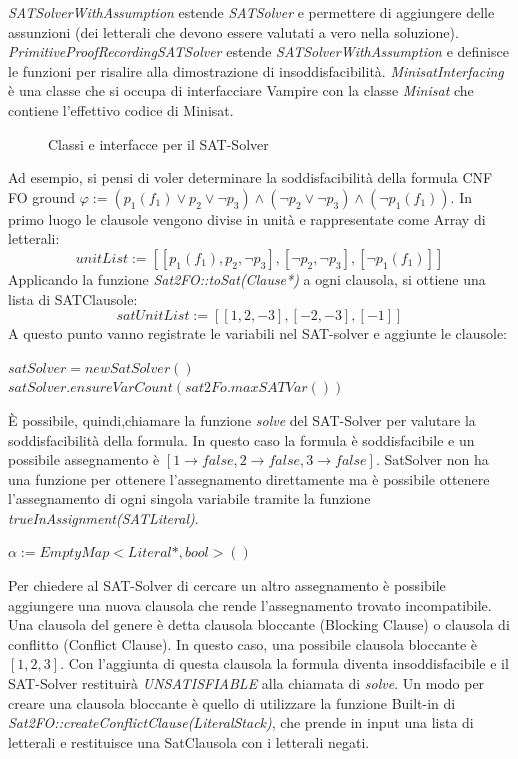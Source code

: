 \documentclass[./main.tex]{subfiles}
\begin{document}
\textit{SATSolverWithAssumption} estende \textit{SATSolver} e permettere di aggiungere delle assunzioni (dei letterali che devono essere valutati a vero nella soluzione).
\textit{PrimitiveProofRecordingSATSolver} estende \textit{SATSolverWithAssumption} e definisce le funzioni per risalire alla dimostrazione di insoddisfacibilità.
\textit{MinisatInterfacing} è una classe che si occupa di interfacciare Vampire con la classe \textit{Minisat} che contiene
l'effettivo codice di Minisat.

\begin{figure}[h]
    \centering
    \scalebox{0.5}{
        
    }
    \caption{Classi e interfacce per il SAT-Solver}
    \label{fig:vampire_sat_solver}
\end{figure}

Ad esempio, si pensi di voler determinare la soddisfacibilità della formula CNF FO ground 
$\varphi := (p_1(f_1) \lor p_2 \lor \lnot p_3) \land (\lnot p_2 \lor \lnot p_3) \land (\lnot p_1(f_1))$.
In primo luogo le clausole vengono divise in unità e rappresentate come Array di letterali:
$$unitList := [[p_1(f_1), p_2, \lnot p_3], [\lnot p_2, \lnot p_3], [\lnot p_1(f_1)]]$$
Applicando la funzione \textit{Sat2FO::toSat(Clause*)} a ogni clausola, si ottiene una lista di SATClausole:
$$satUnitList := [[1, 2, -3], [-2, -3], [-1]]$$
A questo punto vanno registrate le variabili nel SAT-solver e aggiunte le clausole:

$satSolver = new SatSolver()$ \\
$satSolver.ensureVarCount(sat2Fo.maxSATVar())$ \\

È possibile, quindi,chiamare la funzione \textit{solve} del SAT-Solver per valutare la soddisfacibilità della formula.
In questo caso la formula è soddisfacibile e un possibile assegnamento è $[1{\rightarrow}false, 2{\rightarrow}false, 3{\rightarrow}false]$.
SatSolver non ha una funzione per ottenere l'assegnamento direttamente ma è possibile ottenere l'assegnamento di ogni singola variabile
tramite la funzione \textit{trueInAssignment(SATLiteral)}.

$\alpha := EmptyMap<Literal*, bool>()$ \\


Per chiedere al SAT-Solver di cercare un altro assegnamento è possibile aggiungere una nuova clausola 
che rende l'assegnamento trovato incompatibile. Una clausola del genere è detta clausola bloccante (Blocking Clause) o clausola di conflitto (Conflict Clause).
In questo caso, una possibile clausola bloccante è $[1,2,3]$. 
Con l'aggiunta di questa clausola la formula diventa insoddisfacibile e il SAT-Solver restituirà \textit{UNSATISFIABLE} alla chiamata di \textit{solve}.
Un modo per creare una clausola bloccante è quello di utilizzare la funzione Built-in di \textit{Sat2FO::createConflictClause(LiteralStack)}, 
che prende in input una lista di letterali e restituisce una SatClausola con i letterali negati.
\end{document}
